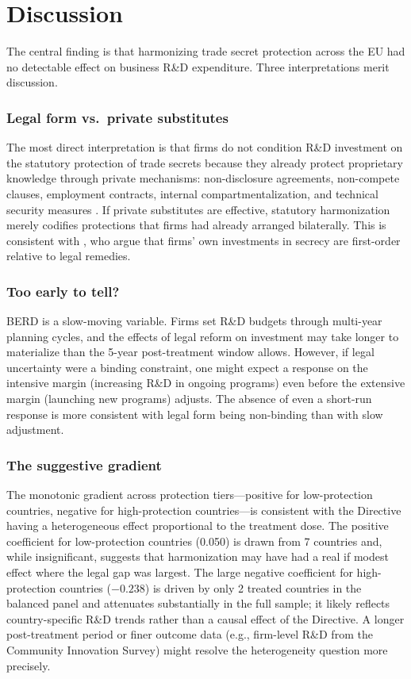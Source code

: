 \documentclass[12pt]{article}
\begin{document}



\section{Discussion}
\label{sec:discussion}

The central finding is that harmonizing trade secret protection across the EU had no detectable effect on business R\&D expenditure. Three interpretations merit discussion.

\subsubsection*{Legal form vs.\ private substitutes} The most direct interpretation is that firms do not condition R\&D investment on the statutory protection of trade secrets because they already protect proprietary knowledge through private mechanisms: non-disclosure agreements, non-compete clauses, employment contracts, internal compartmentalization, and technical security measures \citep{Marx2022}. If private substitutes are effective, statutory harmonization merely codifies protections that firms had already arranged bilaterally. This is consistent with \citet{AlmGilpatric2019}, who argue that firms' own investments in secrecy are first-order relative to legal remedies.

\subsubsection*{Too early to tell?} BERD is a slow-moving variable. Firms set R\&D budgets through multi-year planning cycles, and the effects of legal reform on investment may take longer to materialize than the 5-year post-treatment window allows. However, if legal uncertainty were a binding constraint, one might expect a response on the intensive margin (increasing R\&D in ongoing programs) even before the extensive margin (launching new programs) adjusts. The absence of even a short-run response is more consistent with legal form being non-binding than with slow adjustment.

\subsubsection*{The suggestive gradient} The monotonic gradient across protection tiers---positive for low-protection countries, negative for high-protection countries---is consistent with the Directive having a heterogeneous effect proportional to the treatment dose. The positive coefficient for low-protection countries (0.050) is drawn from 7 countries and, while insignificant, suggests that harmonization may have had a real if modest effect where the legal gap was largest. The large negative coefficient for high-protection countries ($-0.238$) is driven by only 2 treated countries in the balanced panel and attenuates substantially in the full sample; it likely reflects country-specific R\&D trends rather than a causal effect of the Directive. A longer post-treatment period or finer outcome data (e.g., firm-level R\&D from the Community Innovation Survey) might resolve the heterogeneity question more precisely.
\end{document}
